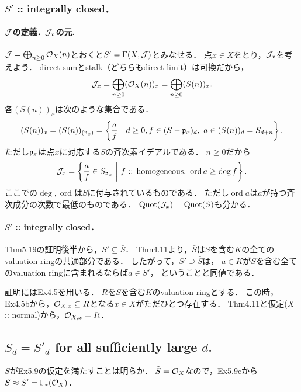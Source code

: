 \documentclass[a4paper]{jsarticle}
\newcommand{\ord}{\operatorname{ord}}
\begin{document}
    \subsubsection{$S'$ :: integrally closed．}

    \paragraph{$\mathcal{J}$の定義．$\mathcal{J}_x$の元.}
    $\mathcal{J}=\bigoplus_{n \geq 0} \mathcal{O}_X(n)$とおくと$S'=\Gamma(X,\mathcal{J})$とみなせる．
    点$x \in X$をとり，$\mathcal{J}_x$を考えよう．
    direct sumとstalk（どちらもdirect limit）は可換だから，
    \[ \mathcal{J}_x=\bigoplus_{n \geq 0} (\mathcal{O}_X(n))_x=\bigoplus_{n \geq 0} (S(n))_x. \]
    各$(S(n))_x$は次のような集合である．
    \[
        (S(n))_x=
        (S(n))_{(\mathfrak{p}_x)}=
        \left\{ \frac{a}{f} ~\middle|~ d \geq 0, f \in (S-\mathfrak{p}_x)_d,~ a \in (S(n))_{d}=S_{d+n} \right\}.
    \]
    ただし$\mathfrak{p}_x$は点$x$に対応する$S$の斉次素イデアルである．
    $n \geq 0$だから
    \[ \shJ_x=\left\{ \frac{a}{f} \in S_{\I{p}_x}~\middle|~ f\text{ :: homogeneous},~ \ord a \geq \deg f \right\}. \]
    ここでの$\deg,\ord$は$S$に付与されているものである．
    ただし$\ord a$は$a$が持つ斉次成分の次数で最低のものである．
    $\operatorname{Quot}(\mathcal{J}_x)=\operatorname{Quot}(S)$も分かる．

    \paragraph{$S'$ :: integrally closed．}
    Thm5.19の証明後半から，$S' \subseteq \bar{S}$．
    Thm4.11より，$\bar{S}$は$S$を含む$K$の全てのvaluation ringの共通部分である．
    したがって，$S' \supseteq \bar{S}$は，
    $a \in K$が$S$を含む全てのvaluation ringに含まれるならば$a \in S'$，
    ということと同値である．

    証明にはEx4.5を用いる．
    $R$を$S$を含む$K$のvaluation ringとする．
    この時，Ex4.5bから，$\mathcal{O}_{X,x} \subseteq R$となる$x \in X$がただひとつ存在する．
    Thm4.11と仮定($X$ :: normal)から，$\mathcal{O}_{X,x}=R$．

    \subsection{$S_d=S'_d$ for all sufficiently large $d$.}
    $S$がEx5.9の仮定を満たすことは明らか．
    $\tilde{S}=\mathcal{O}_X$なので，Ex5.9cから$S \approx S'=\Gamma_*(\mathcal{O}_X)$．
\end{document}
